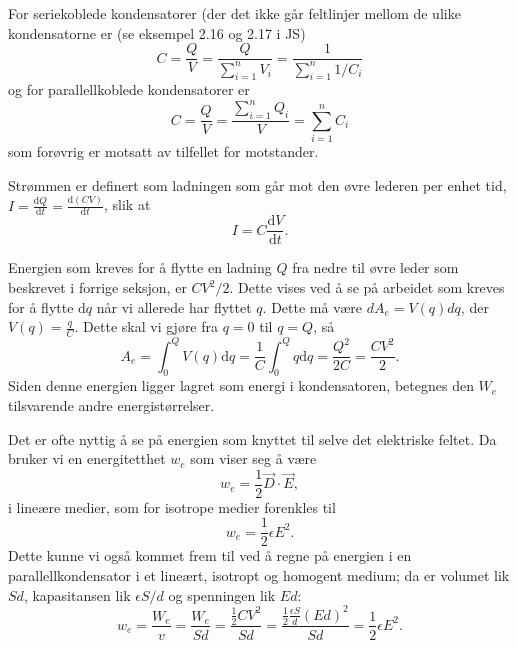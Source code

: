 For seriekoblede kondensatorer (der det ikke går feltlinjer mellom de ulike kondensatorne er (se eksempel 2.16 og 2.17 i JS)
\begin{equation}
	C=\frac{Q}{V}=\frac{Q}{\sum_{i=1}^n V_i} = \frac{1}{\sum_{i=1}^n 1/C_i}
\end{equation}
og for parallellkoblede kondensatorer er
\begin{equation}
	C=\frac{Q}{V}=\frac{\sum_{i=1}^n Q_i}{V} = \sum_{i=1}^n C_i
\end{equation}
som forøvrig er motsatt av tilfellet for motstander.

Strømmen er definert som ladningen som går mot den øvre lederen per enhet tid, $I=\frac{\text{d}Q}{\text{d}t}=\frac{\text{d}(CV)}{\text{d}t}$, slik at
\begin{equation}
	I=C\frac{\text{d}V}{\text{d}t}.
\end{equation}

\noindent Energien som kreves for å flytte en ladning $Q$ fra nedre til øvre leder som beskrevet i forrige seksjon, er $CV^2/2$. Dette vises ved å se på arbeidet som kreves for å flytte $\text{d}q$ når vi allerede har flyttet $q$. Dette må være $dA_e=V(q)dq$, der $V(q)=\frac{q}{C}$. Dette skal vi gjøre fra $q=0$ til $q=Q$, så
\begin{equation}
	A_e=\int_0^QV(q)\text{d}q=\frac{1}{C}\int_0^Qq\text{d}q=\frac{Q^2}{2C}=\frac{CV^2}{2}.
\end{equation}
Siden denne energien ligger lagret som energi i kondensatoren, betegnes den $W_e$ tilsvarende andre energistørrelser.

Det er ofte nyttig å se på energien som knyttet til selve det elektriske feltet. Da bruker vi en energitetthet $w_e$ som viser seg å være
\begin{equation}
	w_e=\frac{1}{2}\vec{D}\cdot\vec{E},
\end{equation}
i lineære medier, som for isotrope medier forenkles til
\begin{equation}
	w_e=\frac{1}{2}\epsilon E^2.
\end{equation}
Dette kunne vi også kommet frem til ved å regne på energien i en parallellkondensator i et lineært, isotropt og homogent medium; da er volumet lik $Sd$, kapasitansen lik $\epsilon S/d$ og spenningen lik $Ed$:
\begin{equation}
	w_e=\frac{W_e}{v}=\frac{W_e}{Sd}=\frac{\frac{1}{2}CV^2}{Sd}=\frac{\frac{1}{2}\frac{\epsilon S}{d}(Ed)^2}{Sd}=\frac{1}{2}\epsilon E^2.
\end{equation}


